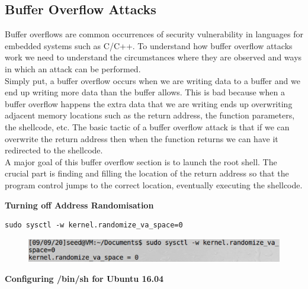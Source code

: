 \documentclass[12pt]{article}
\begin{document}
\newpage

\subsection{Buffer Overflow Attacks}
Buffer overflows are common occurrences of security vulnerability in languages for
embedded systems such as C/C++. To understand how buffer overflow attacks work we
need to understand the circumstances where they are observed and ways in which an
attack can be performed.
\\[0.2in]
Simply put, a buffer overflow occurs when we are writing data to a buffer and
we end up writing more data than the buffer allows. This is bad because when
a buffer overflow happens the extra data that we are writing ends up
overwriting adjacent memory locations such as the return address,
the function parameters, the shellcode, etc. The basic tactic of a
buffer overflow attack is that if we can overwrite the return address then
when the function returns we can have it redirected to the shellcode.
\\[0.2in]
A major goal of this buffer overflow section is to launch the root shell.
The crucial part is finding and filling the location of the return address
so that the program control jumps to the correct location,
eventually executing the shellcode.

\vspace{0.2in}

\begin{center}
    \textbf{Turning off Address Randomisation}
\end{center}

\begin{framed}
    \begin{verbatim}
sudo sysctl -w kernel.randomize_va_space=0
    \end{verbatim}
\end{framed}

\begin{figure}[H]
    \centering
    \includegraphics[width=1\textwidth]{bf-disable-rand.png}
\end{figure}

\vspace{0.2in}

\begin{center}
    \textbf{Configuring /bin/sh for Ubuntu 16.04}
\end{center}
\end{document}
